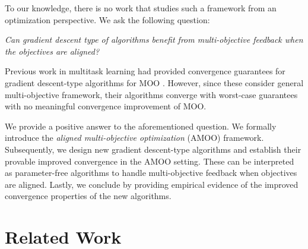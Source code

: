 To our knowledge, there is no work that studies such a framework from an optimization perspective. We ask the following question: 
\begin{center}
    \emph{Can gradient descent type of algorithms benefit from multi-objective feedback when the objectives are aligned?}  
\end{center}
Previous work in multitask learning had provided convergence guarantees for gradient descent-type algorithms for MOO
\citep{sener2018multi,yu2020gradient,liu2021conflict,navon2022multi,he2024robust}. However, since these consider general multi-objective framework, their algorithms converge with worst-case guarantees with no meaningful convergence improvement of MOO.   

We provide a positive answer to the aforementioned question. We formally introduce the \emph{aligned multi-objective optimization} (AMOO) framework. Subsequently, we design new gradient descent-type algorithms and establish their provable improved convergence in the AMOO setting. These can be interpreted as parameter-free algorithms to handle multi-objective feedback when objectives are aligned. Lastly, we conclude by providing empirical evidence of the improved convergence properties of the new algorithms.

\section{Related Work}
